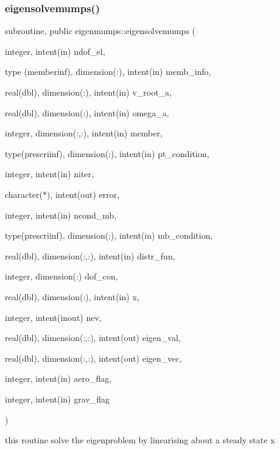 \subsubsection{\texorpdfstring{eigensolvemumps()}{eigensolvemumps()}}
{\footnotesize\ttfamily subroutine, public eigenmumps\+::eigensolvemumps (\begin{DoxyParamCaption}\item[{integer, intent(in)}]{ndof\+\_\+el,  }\item[{type (memberinf), dimension(\+:), intent(in)}]{memb\+\_\+info,  }\item[{real(dbl), dimension(\+:), intent(in)}]{v\+\_\+root\+\_\+a,  }\item[{real(dbl), dimension(\+:), intent(in)}]{omega\+\_\+a,  }\item[{integer, dimension(\+:,\+:), intent(in)}]{member,  }\item[{type(prescriinf), dimension(\+:), intent(in)}]{pt\+\_\+condition,  }\item[{integer, intent(in)}]{niter,  }\item[{character($\ast$), intent(out)}]{error,  }\item[{integer, intent(in)}]{ncond\+\_\+mb,  }\item[{type(prescriinf), dimension(\+:), intent(in)}]{mb\+\_\+condition,  }\item[{real(dbl), dimension(\+:,\+:), intent(in)}]{distr\+\_\+fun,  }\item[{integer, dimension(\+:)}]{dof\+\_\+con,  }\item[{real(dbl), dimension(\+:), intent(in)}]{x,  }\item[{integer, intent(inout)}]{nev,  }\item[{real(dbl), dimension(\+:,\+:), intent(out)}]{eigen\+\_\+val,  }\item[{real(dbl), dimension(\+:,\+:), intent(out)}]{eigen\+\_\+vec,  }\item[{integer, intent(in)}]{aero\+\_\+flag,  }\item[{integer, intent(in)}]{grav\+\_\+flag }\end{DoxyParamCaption})}



this routine solve the eigenproblem by linearising about a steady state x 


